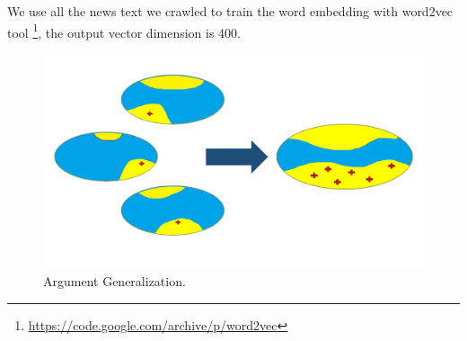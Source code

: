 We use all the news text we crawled to train the word embedding with word2vec tool \footnote{ \url{ https://code.google.com/archive/p/word2vec}}, the output vector dimension is 400. 




\begin{figure}[htbp]
	\centerline{\includegraphics[width=0.9\columnwidth]{figures/argument_generalization}}
	\caption{Argument Generalization.}
	\label{fig:argument_generalization}
\end{figure}


